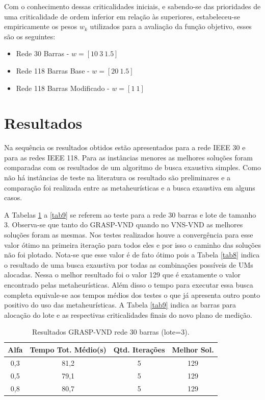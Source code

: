 \documentclass[12pt]{article}
\begin{document}
Com o conhecimento dessas criticalidades iniciais, e sabendo-se das prioridades de uma criticalidade de ordem inferior em relação às superiores, estabeleceu-se empiricamente os pesos $w_k$ utilizados para a avaliação da função objetivo, esses são os seguintes:
\begin{itemize}
	\item Rede 30 Barras - $w=[10~3~1.5]$ 
	\item Rede 118 Barras Base - $w=[20~1.5]$ 
	\item Rede 118 Barras Modificado - $w=[1~1]$ 
\end{itemize}

\section{Resultados}

Na sequência os resultados obtidos estão apresentados para a rede IEEE 30 e para as redes IEEE 118. Para as instâncias menores as melhores soluções foram comparadas com os resultados de um algoritmo de busca exaustiva simples. Como não há instâncias de teste na literatura os resultado são preliminares e a comparação foi realizada entre as metaheurísticas e a busca exaustiva em alguns casos.

A Tabelas \ref{tab6} a \ref{tab9} se referem ao teste para a rede 30 barras e lote de tamanho 3. Observa-se que tanto do GRASP-VND quando no VNS-VND as melhores soluções foram as mesmas. Nos testes realizados houve a convergência para esse valor ótimo na primeira iteração para todos eles e por isso o caminho das soluções não foi plotado. Nota-se que esse valor é de fato ótimo pois a Tabela \ref{tab8} indica o resultado de uma busca exaustiva por todas as combinações possíveis de UMs alocadas. Nessa o melhor resultado foi o valor 129 que é exatamente o valor encontrado pelas metaheurísticas. Além disso o tempo para executar essa busca completa equivale-se aos tempos médios dos testes o que já apresenta outro ponto positivo do uso das metaheurísticas. A Tabela \ref{tab9} indica as barras para alocação do lote e as respectivas criticalidades finais do novo plano de medição.

\begin{table}[H]
	\centering
	\caption{Resultados GRASP-VND rede 30 barras (lote=3).}
	\begin{tabular}{|c|c|c|c|}
		\hline
		\textbf{Alfa} & \textbf{Tempo Tot. Médio(s)} & \textbf{Qtd. Iterações} & \textbf{Melhor Sol.} \\
		\hline
		0,3   & 81,2  & 5     & 129 \\
		\hline
		0,5   & 79,1  & 5     & 129 \\
		\hline
		0,8   & 80,7  & 5     & 129 \\
		\hline
	\end{tabular}%
	\label{tab6}%
\end{table}%
\end{document}
